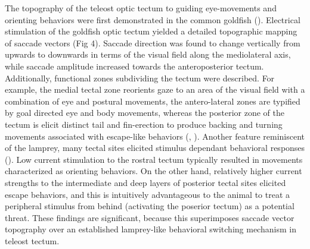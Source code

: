 \documentclass{ar-1col}
\begin{document}
The topography of the teleost optic tectum to guiding eye-movements and orienting behaviors were first demonstrated in the common goldfish (\cite{salas1997tectal}). Electrical stimulation of the goldfish optic tectum yielded a detailed topographic mapping of saccade vectors (Fig 4). Saccade direction was found to change vertically from upwards to downwards in terms of the visual field along the mediolateral axis, while saccade amplitude increased towards the anteroposterior tectum. Additionally, functional zones subdividing the tectum were described. For example, the medial tectal zone reorients gaze to an area of the visual field with a combination of eye and postural movements, the antero-lateral zones are typified by goal directed eye and body movements, whereas the posterior zone of the tectum is elicit distinct tail and fin-erection to produce backing and turning movements associated with escape-like behaviors (\cite{torres2005visual}, \cite{herrero1998tail}). Another feature reminiscent of the lamprey, many tectal sites elicited stimulus dependant behavioral responses (\cite{herrero1998tail}). Low current stimulation to the rostral tectum typically resulted in movements characterized as orienting behaviors. On the other hand, relatively higher current strengths to the intermediate and deep layers of posterior tectal sites elicited escape behaviors, and this is intuitively advantageous to the animal to treat a peripheral stimulus from behind (activating the poserior tectum) as a potential threat. These findings are significant, because this superimposes saccade vector topography over an established lamprey-like behavioral switching mechanism in teleost tectum.  
\end{document}

